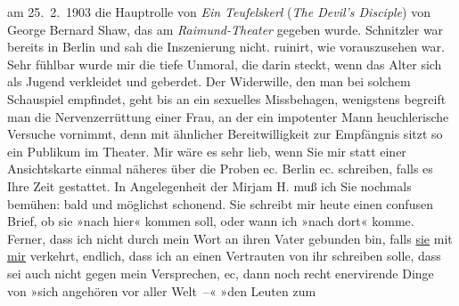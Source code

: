 \begin{ledgroupsized}[t]{13cm}
{{{                  am 25. 2. 1903 die Hauptrolle von \emph{Ein Teufelskerl} (\emph{The Devil’s
                     Disciple}) von George Bernard Shaw,
                  das am \emph{Raimund-Theater} gegeben wurde. Schnitzler war bereits in Berlin und sah die Inszenierung nicht.}}}\label{K_L03339-3h} ruinirt, wie
               vorauszusehen war. Sehr fühlbar wurde mir die tiefe Unmoral, die darin steckt, wenn
               das Alter sich als Jugend verkleidet und geberdet. Der Widerwille, den man bei
               solchem Schauspiel empfindet, geht bis an ein sexuelles Missbehagen, wenigstens
               begreift man die Nervenzerrüttung einer Frau, an der ein impotenter Mann
               heuchlerische Versuche vornimmt, denn mit ähnlicher Bereitwilligkeit zur Empfängnis
               sitzt so ein Publikum im Theater. Mir wäre es sehr lieb, wenn Sie mir statt einer
               Ansichtskarte einmal näheres über die Proben ec. Berlin ec. schreiben, falls es Ihre Zeit gestattet. \pend
           \pstart
           In Angelegenheit der Mirjam H. muß ich Sie
               nochmals bemühen: bald und möglichst schonend. Sie schreibt mir heute einen confusen
               Brief, ob sie »nach hier« kommen soll, oder wann ich »nach dort« komme. Ferner, dass
               ich nicht durch mein Wort an ihren Vater gebunden bin, falls \uline{sie} mit \uline{mir} verkehrt, endlich, dass ich an
               einen Vertrauten von ihr schreiben solle, dass sei auch nicht gegen mein Versprechen,
               ec, dann noch recht enervirende Dinge von »sich angehören vor aller {\pb}Welt –« »den Leuten zum

\end{ledgroupsized}
